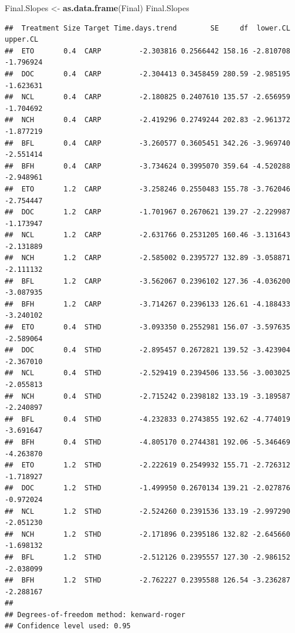 \documentclass[
]{article}
\newenvironment{Shaded}{\begin{snugshade}}{\end{snugshade}}
\newcommand{\FunctionTok}[1]{\textcolor[rgb]{0.13,0.29,0.53}{\textbf{#1}}}
\newcommand{\NormalTok}[1]{#1}
\newcommand{\OtherTok}[1]{\textcolor[rgb]{0.56,0.35,0.01}{#1}}
\begin{document}
\begin{Shaded}
\begin{Highlighting}[]
\NormalTok{Final.Slopes }\OtherTok{\textless{}{-}} \FunctionTok{as.data.frame}\NormalTok{(Final)}
\NormalTok{Final.Slopes}
\end{Highlighting}
\end{Shaded}

\begin{verbatim}
##  Treatment Size Target Time.days.trend        SE     df  lower.CL  upper.CL
##  ETO       0.4  CARP         -2.303816 0.2566442 158.16 -2.810708 -1.796924
##  DOC       0.4  CARP         -2.304413 0.3458459 280.59 -2.985195 -1.623631
##  NCL       0.4  CARP         -2.180825 0.2407610 135.57 -2.656959 -1.704692
##  NCH       0.4  CARP         -2.419296 0.2749244 202.83 -2.961372 -1.877219
##  BFL       0.4  CARP         -3.260577 0.3605451 342.26 -3.969740 -2.551414
##  BFH       0.4  CARP         -3.734624 0.3995070 359.64 -4.520288 -2.948961
##  ETO       1.2  CARP         -3.258246 0.2550483 155.78 -3.762046 -2.754447
##  DOC       1.2  CARP         -1.701967 0.2670621 139.27 -2.229987 -1.173947
##  NCL       1.2  CARP         -2.631766 0.2531205 160.46 -3.131643 -2.131889
##  NCH       1.2  CARP         -2.585002 0.2395727 132.89 -3.058871 -2.111132
##  BFL       1.2  CARP         -3.562067 0.2396102 127.36 -4.036200 -3.087935
##  BFH       1.2  CARP         -3.714267 0.2396133 126.61 -4.188433 -3.240102
##  ETO       0.4  STHD         -3.093350 0.2552981 156.07 -3.597635 -2.589064
##  DOC       0.4  STHD         -2.895457 0.2672821 139.52 -3.423904 -2.367010
##  NCL       0.4  STHD         -2.529419 0.2394506 133.56 -3.003025 -2.055813
##  NCH       0.4  STHD         -2.715242 0.2398182 133.19 -3.189587 -2.240897
##  BFL       0.4  STHD         -4.232833 0.2743855 192.62 -4.774019 -3.691647
##  BFH       0.4  STHD         -4.805170 0.2744381 192.06 -5.346469 -4.263870
##  ETO       1.2  STHD         -2.222619 0.2549932 155.71 -2.726312 -1.718927
##  DOC       1.2  STHD         -1.499950 0.2670134 139.21 -2.027876 -0.972024
##  NCL       1.2  STHD         -2.524260 0.2391536 133.19 -2.997290 -2.051230
##  NCH       1.2  STHD         -2.171896 0.2395186 132.82 -2.645660 -1.698132
##  BFL       1.2  STHD         -2.512126 0.2395557 127.30 -2.986152 -2.038099
##  BFH       1.2  STHD         -2.762227 0.2395588 126.54 -3.236287 -2.288167
## 
## Degrees-of-freedom method: kenward-roger 
## Confidence level used: 0.95
\end{verbatim}
\end{document}
